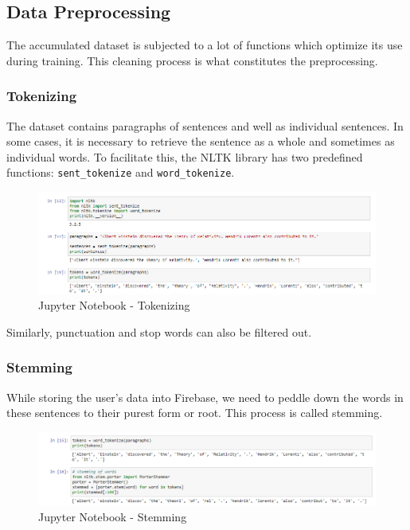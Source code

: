 \pagebreak

\subsection{Data Preprocessing}

The accumulated dataset is subjected to a lot of functions which optimize its use during training. This cleaning process is what constitutes the preprocessing.

\subsubsection{Tokenizing}
The dataset contains paragraphs of sentences and well as individual sentences. In some cases, it is necessary to retrieve the sentence as a whole and sometimes as individual words. To facilitate this, the NLTK library has two predefined functions: \texttt{sent\_tokenize} and \texttt{word\_tokenize}.

\begin{figure}[H]
    \centering
    \includegraphics[width=\linewidth]{images/jupyter-notebook-tokenizing.png}
    \caption{Jupyter Notebook - Tokenizing}
\end{figure}

Similarly, punctuation and stop words can also be filtered out.

\subsubsection{Stemming}
While storing the user’s data into Firebase, we need to peddle down the words in these sentences to their purest form or root. This process is called stemming.

\begin{figure}[H]
    \centering
    \includegraphics[width=\linewidth]{images/jupyter-notebook-stemming.png}
    \caption{Jupyter Notebook - Stemming}
\end{figure}


